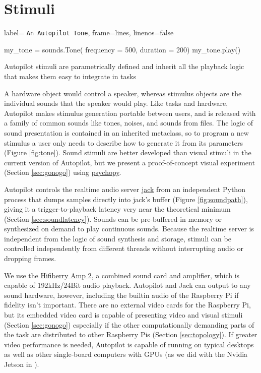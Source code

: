 \section{Stimuli}
\label{sec:stim}

\begin{marginfigure}[0.45cm]
\begin{pythoncode*}{
label= \texttt{An Autopilot Tone},
frame=lines,
linenos=false}

my_tone = sounds.Tone(
    frequency = 500,
    duration  = 200)
my_tone.play()
\end{pythoncode*}
\caption{Autopilot stimuli are parametrically defined and inherit all the playback logic that makes them easy to integrate in tasks}
\label{fig:tone}
\end{marginfigure}

A hardware object would control a speaker, whereas stimulus objects are the individual sounds that the speaker would play. Like tasks and hardware, Autopilot makes stimulus generation portable between users, and is released with a family of common sounds like tones, noises, and sounds from files. The logic of sound presentation is contained in an inherited metaclass, so to program a new stimulus a user only needs to describe how to generate it from its parameters (Figure \ref{fig:tone}).  Sound stimuli are better developed than visual stimuli in the current version of Autopilot, but we present a proof-of-concept visual experiment (Section \ref{sec:gonogo}) using \href{https://www.psychopy.org/}{psychopy}\citep{peircePsychoPy2ExperimentsBehavior2019}.

Autopilot controls the realtime audio server \href{http://jackaudio.org/}{jack} from an independent Python process that dumps samples directly into jack's buffer (Figure \ref{fig:soundpath}), giving it a trigger-to-playback latency very near the theoretical minimum (Section \ref{sec:soundlatency}). Sounds can be pre-buffered in memory or synthesized on demand to play continuous sounds. Because the realtime server is independent from the logic of sound synthesis and storage, stimuli can be controlled independently from different threads without interrupting audio or dropping frames.

We use the \href{https://www.hifiberry.com/shop/boards/hifiberry-amp2/}{Hifiberry Amp 2}, a combined sound card and amplifier, which is capable of 192kHz/24Bit audio playback. Autopilot and Jack can output to any sound hardware, however, including the builtin audio of the Raspberry Pi if fidelity isn't important. There are no external video cards for the Raspberry Pi, but its embedded video card is capable of presenting video and visual stimuli (Section \ref{sec:gonogo}) especially if the other computationally demanding parts of the task are distributed to other Raspberry Pis (Section \ref{sec:topology}). If greater video performance is needed, Autopilot is capable of running on typical desktops as well as other single-board computers with GPUs (as we did with the Nvidia Jetson in \citep{kaneRealtimeLowlatencyClosedloop2020a}).

